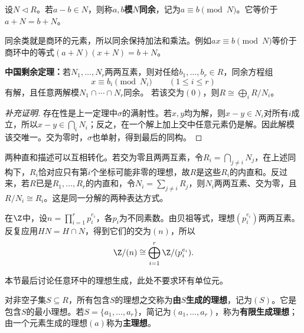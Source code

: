 \begin{definition}
设$N\lhd R$。若$a-b\in N$，则称$a,b$\textbf{模$N$同余}，记为$a\equiv b\pmod N$。它等价于$a+N=b+N$。
\end{definition}

同余类就是商环的元素，所以同余保持加法和乘法。例如$ax\equiv b\pmod N$等价于商环中的等式$(a+N)(x+N)=b+N$。

\begin{corollary}\label{p2:ring-crt-congruence}
\textbf{中国剩余定理：}若$N_1,\ldots,N_r$两两互素，则对任给$b_1,\ldots,b_r\in R$，同余方程组
\[
x\equiv b_i\pmod{N_i}\qquad(1\leq i\leq r)
\]
有解，且任意两解模$N_1\cap\cdots\cap N_r$同余。
若该交为$(0)$，则$R\cong\bigoplus_iR/N_i$。
\end{corollary}
\begin{proof}[补充证明]
存在性是上一定理中$\sigma$的满射性。若$x,y$均为解，则$x-y\in N_i$对所有$i$成立，所以$x-y\in\bigcap_iN_i$；反之，在一个解上加上交中任意元素仍是解。因此解模该交唯一。交为零时，$\sigma$也单射，得到最后的同构。
\end{proof}

两种直和描述可以互相转化。若交为零且两两互素，令$R_i=\bigcap_{j\ne i}N_j$，在上述同构下，$R_i$恰对应只有第$i$个坐标可能非零的理想，故$R$是这些$R_i$的内直和。反过来，若$R$已是$R_1,\ldots,R_r$的内直和，令$N_i=\sum_{j\ne i}R_j$，则$N_i$两两互素、交为零，且$R/N_i\cong R_i$。这是同一分解的两种表达方式。

\begin{example}
在$\Z$中，设$n=\prod_{i=1}^r p_i^{e_i}$，各$p_i$为不同素数。由贝祖等式，理想$(p_i^{e_i})$两两互素。反复应用$HN=H\cap N$，得到它们的交为$(n)$，所以
\[
\Z/(n)\cong\bigoplus_{i=1}^r\Z/(p_i^{e_i}).
\]
\end{example}

本节最后讨论任意环中的理想生成，此处不要求环有单位元。

\begin{definition}
对非空子集$S\subseteq R$，所有包含$S$的理想之交称为\textbf{由$S$生成的理想}，记为$(S)$。它是包含$S$的最小理想。若$S=\{a_1,\ldots,a_r\}$，简记为$(a_1,\ldots,a_r)$，称为\textbf{有限生成理想}；由一个元素生成的理想$(a)$称为\textbf{主理想}。
\end{definition}

